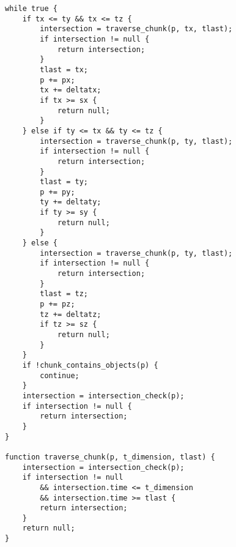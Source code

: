 \begin{lstlisting}[basicstyle=\small, caption={[Adapted CW88 algorithm]The adapted version of CW88 for time-based chunks.}, label={lst:alteredCW88}]
while true {
    if tx <= ty && tx <= tz {
        intersection = traverse_chunk(p, tx, tlast);
        if intersection != null {
            return intersection;
        }
        tlast = tx;
        p += px;
        tx += deltatx;
        if tx >= sx {
            return null;
        }
    } else if ty <= tx && ty <= tz {
        intersection = traverse_chunk(p, ty, tlast);
        if intersection != null {
            return intersection;
        }
        tlast = ty;
        p += py;
        ty += deltaty;
        if ty >= sy {
            return null;
        }
    } else {
        intersection = traverse_chunk(p, ty, tlast);
        if intersection != null {
            return intersection;
        }
        tlast = tz;
        p += pz;
        tz += deltatz;
        if tz >= sz {
            return null;
        }
	}
    if !chunk_contains_objects(p) {
        continue;
    }
    intersection = intersection_check(p);
    if intersection != null {
        return intersection;
    }
}

function traverse_chunk(p, t_dimension, tlast) {
    intersection = intersection_check(p);
    if intersection != null 
        && intersection.time <= t_dimension
        && intersection.time >= tlast {
        return intersection;
    }
    return null;
}
\end{lstlisting}


